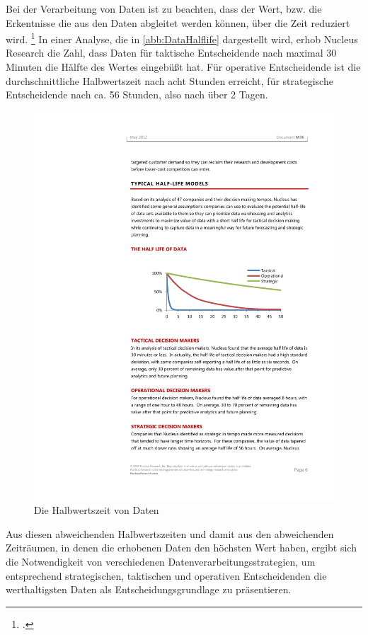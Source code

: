 
Bei der Verarbeitung von Daten ist zu beachten, dass der Wert, bzw. die Erkentnisse die aus den Daten abgleitet werden können, über die Zeit reduziert wird. \footcite[Vgl. auch im Folgenden][]{NucleusResarchInc..2012} In einer Analyse, die in \autoref{abb:DataHalflife} dargestellt wird, erhob Nucleus Research die Zahl, dass Daten für taktische Entscheidende nach maximal 30 Minuten die Hälfte des Wertes eingebüßt hat. Für operative Entscheidende ist die durchschnittliche Halbwertszeit nach acht Stunden erreicht, für strategische Entscheidende nach ca. 56 Stunden, also nach über 2 Tagen.
\begin{figure}[H]
\centering
\includegraphics[width=\textwidth]{graphics/half-life-data.pdf}
\caption[Die Halbwertszeit von Daten]{Die Halbwertszeit von Daten\footnotemark}
\label{abb:DataHalflife}
\end{figure}
Aus diesen abweichenden Halbwertszeiten und damit aus den abweichenden Zeiträumen, in denen die erhobenen Daten den höchsten Wert haben, ergibt sich die Notwendigkeit von verschiedenen Datenverarbeitungsstrategien, um entsprechend strategischen, taktischen und operativen Entscheidenden die werthaltigsten Daten als Entscheidungsgrundlage zu präsentieren.



